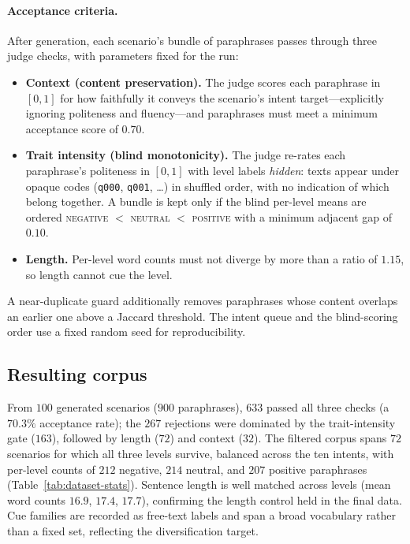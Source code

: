 \documentclass{article}
\begin{document}
\paragraph{Acceptance criteria.}
After generation, each scenario's bundle of paraphrases passes through three
judge checks, with parameters fixed for the run:
\begin{itemize}
  \item \textbf{Context (content preservation).} The judge scores each paraphrase
        in $[0,1]$ for how faithfully it conveys the scenario's intent
        target---explicitly ignoring politeness and fluency---and paraphrases must
        meet a minimum acceptance score of $0.70$.
  \item \textbf{Trait intensity (blind monotonicity).} The judge re-rates each
        paraphrase's politeness in $[0,1]$ with level labels \emph{hidden}: texts
        appear under opaque codes (\texttt{q000}, \texttt{q001}, \dots) in
        shuffled order, with no indication of which belong together. A bundle is
        kept only if the blind per-level means are ordered \textsc{negative} $<$
        \textsc{neutral} $<$ \textsc{positive} with a minimum adjacent gap of
        $0.10$.
  \item \textbf{Length.} Per-level word counts must not diverge by more than a
        ratio of $1.15$, so length cannot cue the level.
\end{itemize}
A near-duplicate guard additionally removes paraphrases whose content overlaps an
earlier one above a Jaccard threshold. The intent queue and the blind-scoring
order use a fixed random seed for reproducibility.

\subsection{Resulting corpus}

From $100$ generated scenarios ($900$ paraphrases), $633$ passed all three checks
(a $70.3\%$ acceptance rate); the $267$ rejections were dominated by the
trait-intensity gate ($163$), followed by length ($72$) and context ($32$). The
filtered corpus spans $72$ scenarios for which all three levels survive, balanced
across the ten intents, with per-level counts of $212$ negative, $214$ neutral,
and $207$ positive paraphrases (Table~\ref{tab:dataset-stats}). Sentence length is
well matched across levels (mean word counts $16.9$, $17.4$, $17.7$), confirming
the length control held in the final data. Cue families are recorded as free-text
labels and span a broad vocabulary rather than a fixed set, reflecting the
diversification target.
\end{document}
